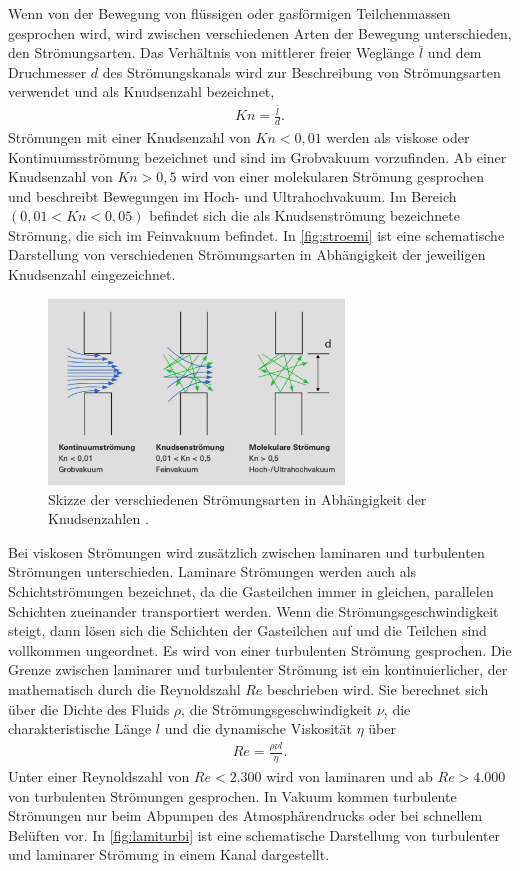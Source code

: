 Wenn von der Bewegung von flüssigen oder gasförmigen Teilchenmassen gesprochen wird, wird zwischen verschiedenen Arten der Bewegung unterschieden, den Strömungsarten. Das Verhältnis 
von mittlerer freier Weglänge $\bar l$ und dem Druchmesser $d$ des Strömungskanals wird zur Beschreibung von Strömungsarten verwendet und als Knudsenzahl bezeichnet,
\begin{align}
    Kn = \frac{\bar l}{d}.
\end{align}
Strömungen mit einer Knudsenzahl von $Kn < 0,01$ werden als viskose oder Kontinuumsströmung bezeichnet und sind im Grobvakuum vorzufinden. Ab einer Knudsenzahl von $Kn > 0,5$ wird 
von einer molekularen Strömung gesprochen und beschreibt Bewegungen im Hoch- und Ultrahochvakuum. Im Bereich 
$(0,01 < Kn < 0,05)$ befindet sich die als Knudsenströmung bezeichnete Strömung, die sich im Feinvakuum befindet. In \autoref{fig:stroemi} ist eine schematische Darstellung von verschiedenen Strömungsarten in Abhängigkeit der jeweiligen Knudsenzahl
eingezeichnet.
\begin{figure}[H]
    \centering
    \includegraphics[width=0.7\textwidth]{data/stroemungen.png}
    \caption{Skizze der verschiedenen Strömungsarten in Abhängigkeit der Knudsenzahlen \cite{EinfuehrungVakuum}.}
    \label{fig:stroemi}
\end{figure}

\noindent
Bei viskosen Strömungen wird zusätzlich zwischen laminaren und turbulenten Strömungen unterschieden. Laminare Strömungen werden auch als Schichtströmungen bezeichnet, da die Gasteilchen immer in gleichen, parallelen Schichten
zueinander transportiert werden. Wenn die Strömungsgeschwindigkeit steigt, dann lösen sich die Schichten der Gasteilchen auf und die Teilchen sind vollkommen ungeordnet. Es wird von einer turbulenten Strömung gesprochen.
Die Grenze zwischen laminarer und turbulenter Strömung ist ein kontinuierlicher, der mathematisch durch die Reynoldszahl $Re$ beschrieben wird. Sie berechnet sich über die Dichte des Fluids $\rho$, die Strömungsgeschwindigkeit $\nu$,
die charakteristische Länge $l$ und die dynamische Viskosität $\eta$ über
\begin{align}
    Re= \frac{\rho\nu l}{\eta}.
\end{align}
Unter einer Reynoldszahl von $Re< 2.300$ wird von laminaren und ab $Re>4.000$ von turbulenten Strömungen gesprochen. In Vakuum kommen turbulente Strömungen nur beim Abpumpen des Atmosphärendrucks oder bei schnellem Belüften vor.
In \autoref{fig:lamiturbi} ist eine schematische Darstellung von turbulenter und laminarer Strömung in einem Kanal dargestellt.

